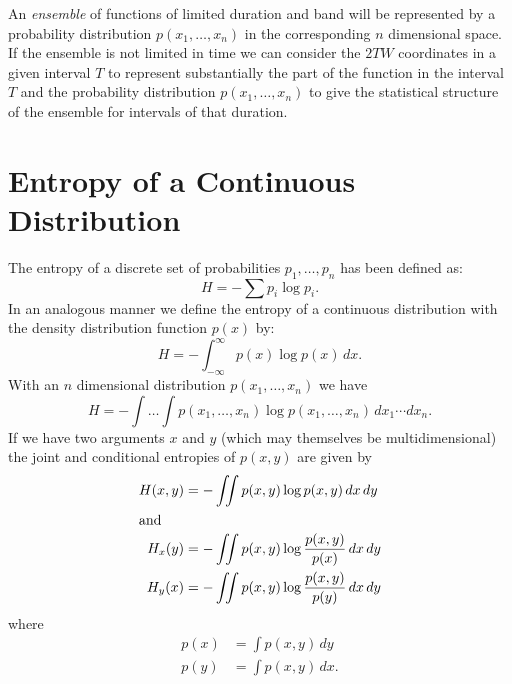 An \emph{ensemble} of functions of limited duration and band will be
represented by a probability distribution $p(x_1,\dots,x_n)$ in the
corresponding $n$ dimensional space.  If the ensemble is not limited in
time we can consider the $2T W$ coordinates in a given interval $T$ to
represent substantially the part of the function in the interval $T$ and
the probability distribution $p(x_1,\dots,x_n)$ to give the statistical
structure of the ensemble for intervals of that duration.

\section{Entropy of a Continuous Distribution}

The entropy of a discrete set of probabilities $p_1,\dots,p_n$ has been
defined as:
$$
H=-\sum p_i\log p_i.
$$
In an analogous manner we define the entropy of a continuous
distribution with the density distribution function $p(x)$ by:
$$
H=-\int_{-\infty}^\infty p(x)\log p(x)\,dx.
$$
With an $n$ dimensional distribution $p(x_1,\dots,x_n)$ we have
$$
H=-\int\dots\int p(x_1,\dots,x_n)\log p(x_1,\dots,x_n)\,
	dx_1\dotsm dx_n.
$$
If we have two arguments $x$ and $y$ (which may themselves be
multidimensional) the joint and conditional entropies of $p(x,y)$ are
given by
\begin{align*}
H(x,y)&=-\iint p(x,y)\log p(x,y)\,dx\,dy\\
\intertext{and}
H_x(y)&=-\iint p(x,y)\log\frac{p(x,y)}{p(x)}\,dx\,dy\\
H_y(x)&=-\iint p(x,y)\log\frac{p(x,y)}{p(y)}\,dx\,dy
\end{align*}
where
\begin{align*}
p(x)&=\int p(x,y)\,dy\\
p(y)&=\int p(x,y)\,dx.
\end{align*}

